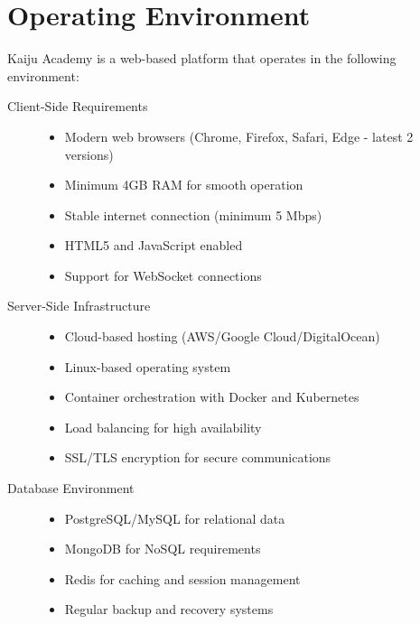 \documentclass[a4paper, 11pt]{scrreprt}
\begin{document}
\section{Operating Environment}

Kaiju Academy is a web-based platform that operates in the following environment:

\begin{description}
    \item[Client-Side Requirements]
        \begin{itemize}
            \item Modern web browsers (Chrome, Firefox, Safari, Edge - latest 2 versions)
            \item Minimum 4GB RAM for smooth operation
            \item Stable internet connection (minimum 5 Mbps)
            \item HTML5 and JavaScript enabled
            \item Support for WebSocket connections
        \end{itemize}
    
    \item[Server-Side Infrastructure]
        \begin{itemize}
            \item Cloud-based hosting (AWS/Google Cloud/DigitalOcean)
            \item Linux-based operating system
            \item Container orchestration with Docker and Kubernetes
            \item Load balancing for high availability
            \item SSL/TLS encryption for secure communications
        \end{itemize}
    
    \item[Database Environment]
        \begin{itemize}
            \item PostgreSQL/MySQL for relational data
            \item MongoDB for NoSQL requirements
            \item Redis for caching and session management
            \item Regular backup and recovery systems
        \end{itemize}
    

\end{description}
\end{document}
